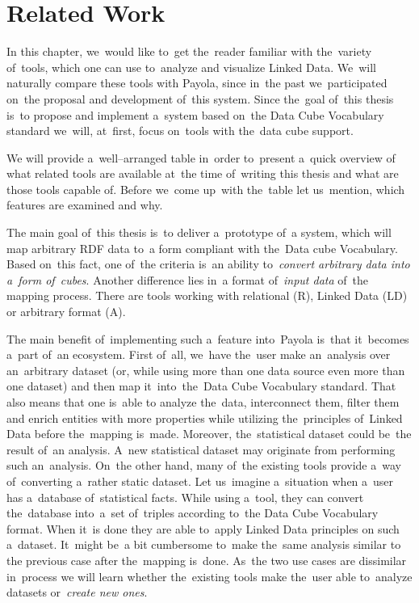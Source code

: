 \chapter{Related Work}
\label{chap:rw}

In this chapter, we~would like to~get the~reader familiar with the~variety of~tools, which one can
use to~analyze and visualize Linked Data. We~will naturally compare these tools with
Payola, since in~the past we~participated on~the proposal and development of~this system.
Since the~goal of~this thesis is~to propose and implement a~system based on~the Data Cube Vocabulary
standard we~will, at~first, focus on~tools with the~data cube support. 

We will provide a~well--arranged table in~order to~present a~quick overview of
what related tools are available at~the time of~writing this thesis and what are those 
tools capable of. Before we~come up~with the~table let us~mention, which
features are examined and why.

The main goal of~this thesis is~to deliver a~prototype of~a system, which will map 
arbitrary RDF data to~a form compliant with the~Data cube Vocabulary. Based on~this fact, one of~the criteria is~an ability to~\emph{convert arbitrary data 
into a~form of~cubes}. Another difference lies in~a format of~\emph{input data} of~the
mapping process. There are tools working with relational (R), Linked Data (LD) or
arbitrary format (A).

The main benefit of~implementing such a~feature into~Payola is~that it~becomes a~part of~an ecosystem. First of~all, we~have the~user make an~analysis over an~arbitrary
dataset (or, while using more than one data source even more than one dataset)
and then map it~into~the~Data Cube Vocabulary standard. That also means that one is~able
to analyze the~data, interconnect them, filter them and enrich entities with more properties
while utilizing the~principles of~Linked Data before the~mapping is~made. Moreover, the~statistical
dataset could be~the result of~an analysis. A~new statistical dataset may originate from performing
such an~analysis. On~the other hand, many of~the existing 
tools provide a~way of~converting a~rather static dataset. Let us~imagine a~situation when a~user has a~database of~statistical facts. While using a~tool, they can 
convert the~database into~a~set of~triples according to~the Data Cube 
Vocabulary format. When it~is done they are able to~apply Linked Data principles
on such a~dataset. It~might be~a bit cumbersome to~make the~same analysis similar to
the previous case after the~mapping is~done. As~the two use cases are dissimilar in~process 
we will learn whether the~existing tools make the~user able to~analyze datasets or~\emph{create new ones}.

